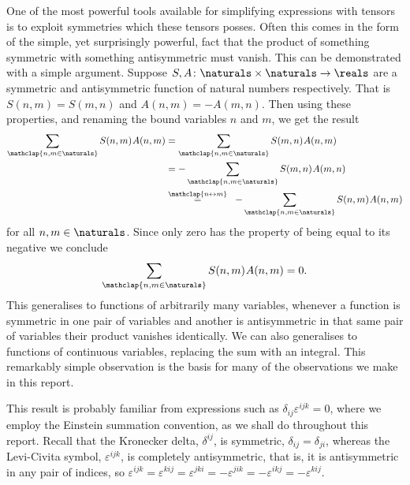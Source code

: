 \documentclass[fleqn]{NotesClass}
\begin{document}
    One of the most powerful tools available for simplifying expressions with tensors is to exploit symmetries which these tensors posses.
    Often this comes in the form of the simple, yet surprisingly powerful, fact that the product of something symmetric with something antisymmetric must vanish.
    This can be demonstrated with a simple argument.
    Suppose \(S, A \colon \naturals \times \naturals \to \reals\) are a symmetric and antisymmetric function of natural numbers respectively.
    That is \(S(n, m) = S(m, n)\) and \(A(n, m) = -A(m, n)\).
    Then using these properties, and renaming the bound variables \(n\) and \(m\), we get the result
    \begin{alignat}{3}
        \sum_{\mathclap{n, m \in \naturals}} S(n, m)\mkern1muA(n, m) &= \sum_{\mathclap{n, m \in \naturals}} S(m, n)\mkern1muA(n, m)\\
        &= -\sum_{\mathclap{n, m \in \naturals}} S(m, n)\mkern1muA(m, n)\\
        &\overset{\mathclap{n \leftrightarrow m}}{=} \mkern10mu -\sum_{\mathclap{n, m \in \naturals}} S(n, m)\mkern1muA(n, m)
    \end{alignat}
    for all \(n, m \in \naturals\).
    Since only zero has the property of being equal to its negative we conclude
    \begin{equation}
        \sum_{\mathclap{n,m\in\naturals}} S(n, m)\mkern1mu A(n, m) = 0.
    \end{equation}
    This generalises to functions of arbitrarily many variables, whenever a function is symmetric in one pair of variables and another is antisymmetric in that same pair of variables their product vanishes identically.
    We can also generalises to functions of continuous variables, replacing the sum with an integral.
    This remarkably simple observation is the basis for many of the observations we make in this report.
    
    This result is probably familiar from expressions such as \(\delta_{ij}\varepsilon^{ijk} = 0\), where we employ the Einstein summation convention, as we shall do throughout this report.
    Recall that the Kronecker delta, \(\delta^{ij}\), is symmetric, \(\delta_{ij} = \delta_{ji}\), whereas the Levi-Civita symbol, \(\varepsilon^{ijk}\), is completely antisymmetric, that is, it is antisymmetric in any pair of indices, so \(\varepsilon^{ijk} = \varepsilon^{kij} = \varepsilon^{jki} = -\varepsilon^{jik} = -\varepsilon^{ikj} = -\varepsilon^{kij}\).
    
\end{document}
